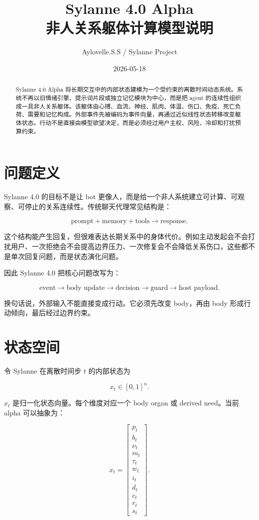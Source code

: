 \documentclass[UTF8,12pt]{ctexart}
\title{Sylanne 4.0 Alpha\\非人关系躯体计算模型说明}
\author{Aylovelle.S.S / Sylanne Project}
\date{2026-05-18}
\begin{document}
\maketitle

\begin{abstract}
Sylanne 4.0 Alpha 将长期交互中的内部状态建模为一个受约束的离散时间动态系统。系统不再以旧情绪引擎、提示词片段或独立记忆模块为中心，而是把 agent 的连续性组织成一具非人关系躯体。该躯体由心搏、血流、神经、肌肉、体温、伤口、免疫、死亡负荷、需要和记忆构成。外部事件先被编码为事件向量，再通过近似线性状态转移改变躯体状态。行动不是直接由模型欲望决定，而是必须经过用户主权、风险、冷却和打扰预算约束。
\end{abstract}

\section{问题定义}

Sylanne 4.0 的目标不是让 bot 更像人，而是给一个非人系统建立可计算、可观察、可停止的关系连续性。传统聊天代理常见结构是：

\[
\text{prompt} + \text{memory} + \text{tools} \rightarrow \text{response}.
\]

这个结构能产生回复，但很难表达长期关系中的身体代价。例如主动发起会不会打扰用户、一次拒绝会不会提高边界压力、一次修复会不会降低关系伤口，这些都不是单次回复问题，而是状态演化问题。

因此 Sylanne 4.0 把核心问题改写为：

\[
\text{event} \rightarrow \text{body update} \rightarrow \text{decision} \rightarrow \text{guard} \rightarrow \text{host payload}.
\]

换句话说，外部输入不能直接变成行动。它必须先改变 body，再由 body 形成行动倾向，最后经过边界约束。

\section{状态空间}

令 Sylanne 在离散时间步 $t$ 的内部状态为

\[
x_t \in [0,1]^n.
\]

$x_t$ 是归一化状态向量。每个维度对应一个 body organ 或 derived need。当前 alpha 可以抽象为：

\[
x_t =
\begin{bmatrix}
p_t \\
b_t \\
\nu_t \\
m_t \\
\tau_t \\
w_t \\
i_t \\
d_t \\
c_t \\
r_t \\
s_t
\end{bmatrix}.
\]
\end{document}
